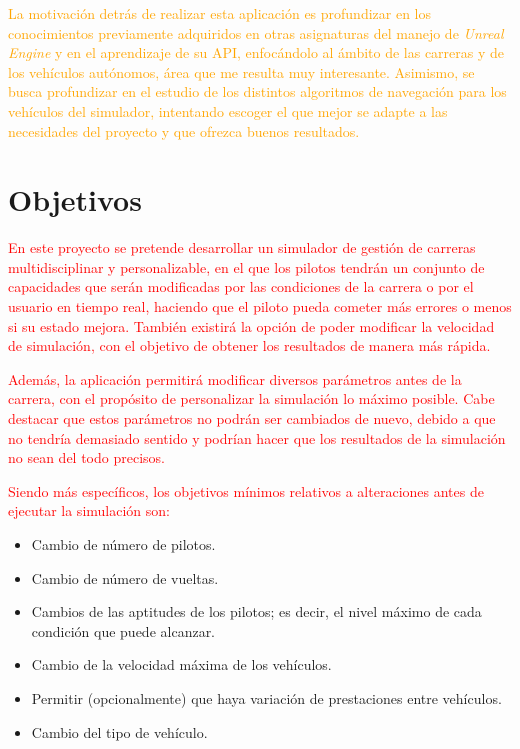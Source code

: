 \documentclass[a4paper,11pt]{book}
\begin{document}
\bigskip

\textcolor{orange}{La motivación detrás de realizar esta aplicación es profundizar en los conocimientos previamente adquiridos en otras asignaturas del manejo de \textit{Unreal Engine} y en el aprendizaje de su API, enfocándolo al ámbito de las carreras y de los vehículos autónomos, área que me resulta muy interesante. Asimismo, se busca profundizar en el estudio de los distintos algoritmos de navegación para los vehículos del simulador, intentando escoger el que mejor se adapte a las necesidades del proyecto y que ofrezca buenos resultados.}

\section{Objetivos}

\textcolor{red}{En este proyecto se pretende desarrollar un simulador de gestión de carreras multidisciplinar y personalizable, en el que los pilotos tendrán un conjunto de capacidades que serán modificadas por las condiciones de la carrera o por el usuario en tiempo real, haciendo que el piloto pueda cometer más errores o menos si su estado mejora. También existirá la opción de poder modificar la velocidad de simulación, con el objetivo de obtener los resultados de manera más rápida.}

\bigskip

\textcolor{red}{Además, la aplicación permitirá modificar diversos parámetros antes de la carrera, con el propósito de personalizar la simulación lo máximo posible. Cabe destacar que estos parámetros no podrán ser cambiados de nuevo, debido a que no tendría demasiado sentido y podrían hacer que los resultados de la simulación no sean del todo precisos.}


\bigskip


\textcolor{red}{Siendo más específicos, los objetivos mínimos relativos a alteraciones antes de ejecutar la simulación son:}

\begin{itemize}
   \item Cambio de número de pilotos.
   \item Cambio de número de vueltas.
   \item Cambios de las aptitudes de los pilotos; es decir, el nivel máximo de cada condición que puede alcanzar.
   \item Cambio de la velocidad máxima de los vehículos.
   \item Permitir (opcionalmente) que haya variación de prestaciones entre vehículos.
   \item Cambio del tipo de vehículo.
\end{itemize}
\end{document}
